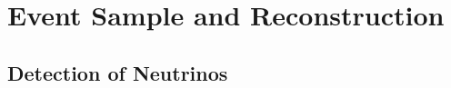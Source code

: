 \setchapterpreamble[u]{\margintoc}
\chapter{Event Sample and Reconstruction}


\section{Detection of Neutrinos} 
\label{sec:nu_detection}